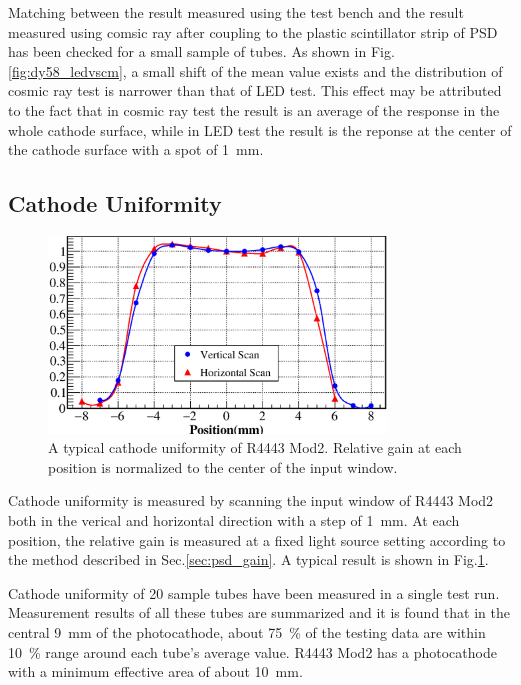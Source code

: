 \documentclass[5p, times]{elsarticle}
\begin{document}
Matching between the result measured using the test bench and the result measured using comsic ray after coupling to the plastic scintillator strip of PSD has been checked for a small sample of tubes.
As shown in Fig.\ref{fig:dy58_ledvscm}, a small shift of the mean value exists and the distribution of cosmic ray test is narrower than that of LED test. 
This effect may be attributed to the fact that in cosmic ray test the result is an average of the response in the whole cathode surface, while in LED test the result is the reponse at the center of the cathode surface with a spot of \SI{1}{\milli\meter}.


\subsection{Cathode Uniformity}
\label{sec:psd_cathodescan}

\begin{figure}
 \centering
 \includegraphics[width=90mm]{cathode_uniformity}
\caption{A typical cathode uniformity of R4443 Mod2.
Relative gain at each position is normalized to the center of the input window.}
\label{fig:cathode_uniformity}
\end{figure} 


Cathode uniformity is measured by scanning the input window of R4443 Mod2 both in the verical and horizontal direction with a step of \SI{1}{\milli\meter}.
At each position, the relative gain is measured at a fixed light source setting according to the method described in Sec.\ref{sec:psd_gain}.
A typical result is shown in Fig.\ref{fig:cathode_uniformity}.

Cathode uniformity of 20 sample tubes have been measured in a single test run.
Measurement results of all these tubes are summarized and it is found that in the central \SI{9}{\milli\meter} of the photocathode, about \SI{75}{\percent} of the testing data are within \textpm\SI{10}{\percent} range around each tube's average value.
R4443 Mod2 has a photocathode with a minimum effective area of about \SI{10}{\milli\meter}.
\end{document}
